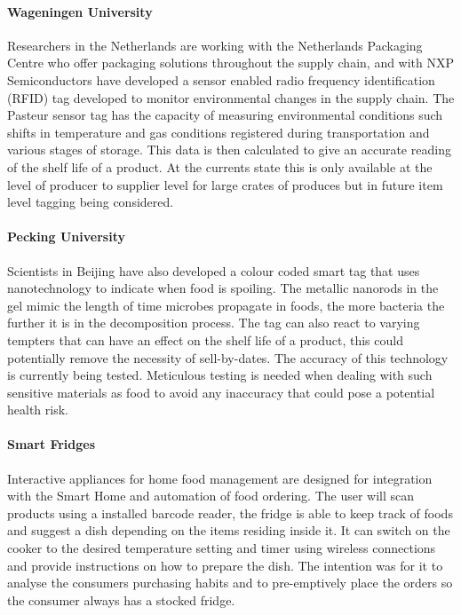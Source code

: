 \documentclass[a4paper, 11pt]{article}
\begin{document}
\paragraph{Wageningen University}Researchers in the Netherlands are working with the Netherlands Packaging Centre who offer packaging solutions throughout the supply chain, and with NXP Semiconductors have developed a sensor enabled radio frequency identification (RFID) tag developed to monitor environmental changes in the supply chain. The Pasteur sensor tag has the capacity of measuring environmental conditions such shifts in temperature and gas conditions registered during transportation and various stages of storage. This data is then calculated to give an accurate reading of the shelf life of a product. At the currents state this is only available at the level of producer to supplier level for large crates of produces but in future item level tagging being considered. 

\paragraph{Pecking University}Scientists in Beijing have also developed a colour coded smart tag that uses nanotechnology to indicate when food is spoiling. The metallic nanorods in the gel mimic the length of time microbes propagate in foods, the more bacteria the further it is in the decomposition process. The tag can also react to varying tempters that can have an effect on the shelf life of a product, this could potentially remove the necessity of sell-by-dates. The accuracy of this technology is currently being tested. Meticulous testing is needed when dealing with such sensitive materials as food to avoid any inaccuracy that could pose a potential health risk.

\paragraph{Smart Fridges} Interactive appliances for home food management are designed for integration with the Smart Home and automation of food ordering. The user will scan products using a installed barcode reader, the fridge is able to keep track of foods and suggest a dish depending on the items residing inside it. It can switch on the cooker to the desired temperature setting and timer using wireless connections and provide instructions on how to prepare the dish. The intention was for it to analyse the consumers purchasing habits and to pre-emptively place the orders so the consumer always has a stocked fridge. 
\end{document}
